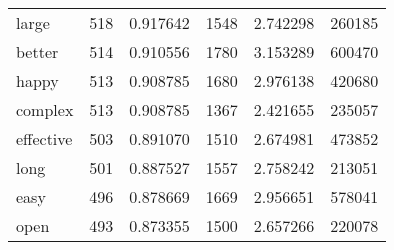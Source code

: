 \begin{table}[ht]
\begin{tabular}{lrrrrr}
large & {\cellcolor[HTML]{E5F5F9}} \color[HTML]{000000} 518 & {\cellcolor[HTML]{E5F5F9}} \color[HTML]{000000} 0.917642 & {\cellcolor[HTML]{E9F7FA}} \color[HTML]{000000} 1548 & {\cellcolor[HTML]{E9F7FA}} \color[HTML]{000000} 2.742298 & {\cellcolor[HTML]{EAF7FA}} \color[HTML]{000000} 260185 \\
better & {\cellcolor[HTML]{E7F6F9}} \color[HTML]{000000} 514 & {\cellcolor[HTML]{E7F6F9}} \color[HTML]{000000} 0.910556 & {\cellcolor[HTML]{D4EFEC}} \color[HTML]{000000} 1780 & {\cellcolor[HTML]{D4EFEC}} \color[HTML]{000000} 3.153289 & {\cellcolor[HTML]{C5E9E2}} \color[HTML]{000000} 600470 \\
happy & {\cellcolor[HTML]{E7F6F9}} \color[HTML]{000000} 513 & {\cellcolor[HTML]{E7F6F9}} \color[HTML]{000000} 0.908785 & {\cellcolor[HTML]{DEF2F4}} \color[HTML]{000000} 1680 & {\cellcolor[HTML]{DEF2F4}} \color[HTML]{000000} 2.976138 & {\cellcolor[HTML]{DBF2F2}} \color[HTML]{000000} 420680 \\
complex & {\cellcolor[HTML]{E7F6F9}} \color[HTML]{000000} 513 & {\cellcolor[HTML]{E7F6F9}} \color[HTML]{000000} 0.908785 & {\cellcolor[HTML]{F6FCFD}} \color[HTML]{000000} 1367 & {\cellcolor[HTML]{F6FCFD}} \color[HTML]{000000} 2.421655 & {\cellcolor[HTML]{ECF8FA}} \color[HTML]{000000} 235057 \\
effective & {\cellcolor[HTML]{EBF7FA}} \color[HTML]{000000} 503 & {\cellcolor[HTML]{EBF7FA}} \color[HTML]{000000} 0.891070 & {\cellcolor[HTML]{ECF8FA}} \color[HTML]{000000} 1510 & {\cellcolor[HTML]{ECF8FA}} \color[HTML]{000000} 2.674981 & {\cellcolor[HTML]{D5EFED}} \color[HTML]{000000} 473852 \\
long & {\cellcolor[HTML]{EBF7FA}} \color[HTML]{000000} 501 & {\cellcolor[HTML]{EBF7FA}} \color[HTML]{000000} 0.887527 & {\cellcolor[HTML]{E8F6FA}} \color[HTML]{000000} 1557 & {\cellcolor[HTML]{E8F6FA}} \color[HTML]{000000} 2.758242 & {\cellcolor[HTML]{EDF8FB}} \color[HTML]{000000} 213051 \\
easy & {\cellcolor[HTML]{EDF8FB}} \color[HTML]{000000} 496 & {\cellcolor[HTML]{EDF8FB}} \color[HTML]{000000} 0.878669 & {\cellcolor[HTML]{DFF3F5}} \color[HTML]{000000} 1669 & {\cellcolor[HTML]{DFF3F5}} \color[HTML]{000000} 2.956651 & {\cellcolor[HTML]{CAEBE5}} \color[HTML]{000000} 578041 \\
open & {\cellcolor[HTML]{EEF8FB}} \color[HTML]{000000} 493 & {\cellcolor[HTML]{EEF8FB}} \color[HTML]{000000} 0.873355 & {\cellcolor[HTML]{ECF8FB}} \color[HTML]{000000} 1500 & {\cellcolor[HTML]{ECF8FB}} \color[HTML]{000000} 2.657266 & {\cellcolor[HTML]{EDF8FB}} \color[HTML]{000000} 220078 \\

\end{tabular}
\end{table}
